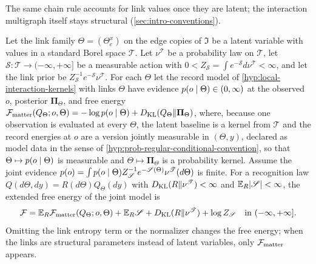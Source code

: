 The same chain rule accounts for link values once they are latent; the
interaction multigraph itself stays structural (\cref{sec:intro-conventions}).

Let the link family $\Theta=(\Theta^x_e)$ on the edge copies of $\mathfrak I$ be
a latent variable with values in a standard Borel space $\mathscr T$. Let
$\nu^{\mathscr T}$ be a probability law on $\mathscr T$, let
$\mathscr S:\mathscr T\to(-\infty,+\infty]$ be a measurable action with
$0<Z_{\mathscr S}=\int e^{-\mathscr S}d\nu^{\mathscr T}<\infty$, and let the link
prior be $Z_{\mathscr S}^{-1}e^{-\mathscr S}\nu^{\mathscr T}$. For each $\Theta$
let the record model of \cref{hyp:local-interaction-kernels} with links $\Theta$
have evidence $p(o\mid\Theta)\in(0,\infty)$ at the observed $o$, posterior
$\boldsymbol\Pi_\Theta$, and free energy
$\mathcal F_{\mathrm{matter}}(Q_\Theta;o,\Theta)=-\log p(o\mid\Theta)+D_{\mathrm{KL}}(Q_\Theta\Vert\boldsymbol\Pi_\Theta)$,
where, because one observation is evaluated at every $\Theta$, the latent
baseline is a kernel from $\mathscr T$ and the record energies at $o$ are a version
jointly measurable in $(\Theta,y)$, declared as model data in the sense of
\cref{hyp:prob-regular-conditional-convention}, so that $\Theta\mapsto p(o\mid\Theta)$
is measurable and $\Theta\mapsto\boldsymbol\Pi_\Theta$ is a probability kernel. Assume
the joint evidence
$p(o)=\int p(o\mid\Theta)Z_{\mathscr S}^{-1}e^{-\mathscr S(\Theta)}\nu^{\mathscr T}(d\Theta)$
is finite. For a recognition law $Q(d\Theta,dy)=R(d\Theta)Q_\Theta(dy)$ with
$D_{\mathrm{KL}}(R\Vert\nu^{\mathscr T})<\infty$ and $\mathbb E_R\lvert\mathscr S\rvert<\infty$, the
extended free energy of the joint model is
\begin{equation}
\mathcal F=\mathbb E_R\mathcal F_{\mathrm{matter}}(Q_\Theta;o,\Theta)+\mathbb E_R\mathscr S
+D_{\mathrm{KL}}(R\Vert\nu^{\mathscr T})+\log Z_{\mathscr S}
\quad\text{in }(-\infty,+\infty].
\label{eq:rg-geometry-random-link-vfe}
\end{equation}
Omitting the link entropy term or the normalizer changes the free energy; when
the links are structural parameters instead of latent variables, only
$\mathcal F_{\mathrm{matter}}$ appears. 

